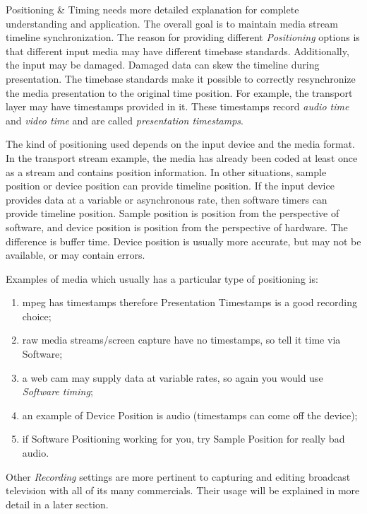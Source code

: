 Positioning \& Timing needs more detailed explanation for complete understanding and application.  The overall goal is to maintain media stream timeline synchronization.  The reason for providing different \textit{Positioning} options is that different input media may have different timebase standards.  Additionally, the input may be damaged.  Damaged data can skew the timeline during presentation.  The timebase standards make it possible to correctly resynchronize the media presentation to the original time position.  For example, the transport layer may have timestamps provided in it.  These timestamps record \textit{audio time} and  \textit{video time} and are called \textit{presentation timestamps}.

The kind of positioning used depends on the input device and the media format.  In the transport stream example, the media has already been coded at least once as a stream and contains position information.  In other situations, sample position or device position can provide timeline position.  If the input device provides data at a variable or asynchronous rate, then software timers can provide timeline position.  Sample position is position from the perspective of software, and device position is position from the perspective of hardware.  The difference is buffer time.  Device position is usually more accurate, but may not be available, or may contain errors.

Examples of media which usually has a particular type of positioning is:

\begin{enumerate}
    \item mpeg has timestamps therefore Presentation Timestamps is a good recording choice;
    \item raw media streams/screen capture have no timestamps, so tell it time via Software;
    \item a web cam may supply data at variable rates, so again you would use \textit{Software timing};
    \item an example of Device Position is audio (timestamps can come off the device);
    \item if Software Positioning working for you, try Sample Position for really bad audio.
\end{enumerate}

Other \textit{Recording} settings are more pertinent to capturing and editing broadcast television with all of its many commercials.  Their usage will be explained in more detail in a later section.

